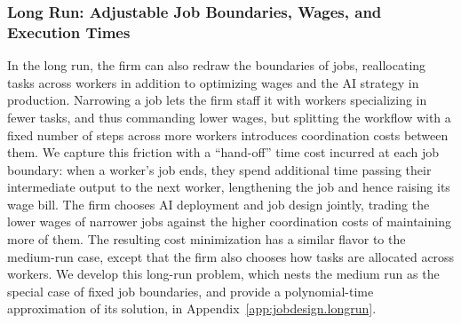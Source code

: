 \subsubsection{Long Run: Adjustable Job Boundaries, Wages, and Execution Times}
\label{sec:model.longrun}
In the long run, the firm can also redraw the boundaries of jobs, reallocating tasks across workers in addition to optimizing wages and the AI strategy in production.
Narrowing a job lets the firm staff it with workers specializing in fewer tasks, and thus commanding lower wages, but splitting the workflow with a fixed number of steps across more workers introduces coordination costs between them.
We capture this friction with a ``hand-off'' time cost incurred at each job boundary: when a worker's job ends, they spend additional time passing their intermediate output to the next worker, lengthening the job and hence raising its wage bill.
The firm chooses AI deployment and job design jointly, trading the lower wages of narrower jobs against the higher coordination costs of maintaining more of them.
The resulting cost minimization has a similar flavor to the medium-run case, except that the firm also chooses how tasks are allocated across workers.
We develop this long-run problem, which nests the medium run as the special case of fixed job boundaries, and provide a polynomial-time approximation of its solution, in Appendix~\ref{app:jobdesign.longrun}.
